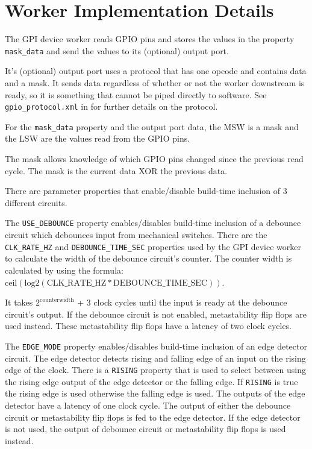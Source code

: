\documentclass{article}
\begin{document}
\section*{Worker Implementation Details}
\begin{flushleft}

The GPI device worker reads GPIO pins and stores the values in the property \texttt{mask\_data} and send the values to its (optional) output port. \newline

It's (optional) output port uses a protocol that has one opcode and contains data and a mask. It sends data regardless of whether or not the worker downstream is ready, so it is something that cannot be piped directly to software. See \texttt{gpio\_protocol.xml} in   for further details on the protocol. \newline

For the \texttt{mask\_data} property and the output port data, the MSW is a mask and the LSW are the values read from the GPIO pins. \newline

The mask allows knowledge of which GPIO pins changed since the previous read cycle. The mask is the current data XOR the previous data. \newline

There are parameter properties that enable/disable build-time inclusion of 3 different circuits.  \newline

The \texttt{USE\_DEBOUNCE} property enables/disables build-time inclusion of a debounce circuit which debounces input from mechanical switches. 
There are the \texttt{CLK\_RATE\_HZ} and \texttt{DEBOUNCE\_TIME\_SEC} properties used by the GPI device worker to calculate the width of the debounce circuit's counter. The counter width is calculated by using the formula: $\mathrm{ceil(log2(CLK\_RATE\_HZ * DEBOUNCE\_TIME\_SEC))}$. 

It takes $2^{\mathrm{counter width}}$ + 3 clock cycles until the input is ready at the debounce circuit's output. If the debounce circuit is not enabled, metastability flip flops are used instead. These metastability flip flops have a latency of two clock cycles. \newline

The \texttt{EDGE\_MODE} property enables/disables build-time inclusion of an edge detector circuit. The edge detector detects rising and falling edge of an input
on the rising edge of the clock. There is a \texttt{RISING} property that is used to select between using the rising edge output of the edge detector or the falling edge. If \texttt{RISING} is true the rising edge is used otherwise the falling edge is used. The outputs of the edge detector have a latency of one clock cycle. The output of either the debounce circuit or metastability flip flops is fed to the edge detector. If the edge detector is not used, the output of debounce circuit or metastability flip flops is used instead. \newline


\end{flushleft}
\end{document}
